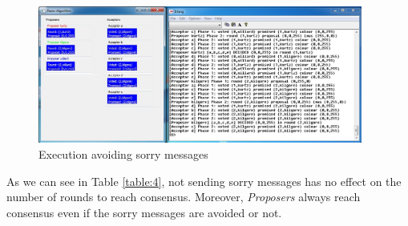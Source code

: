 \begin{figure}[h!]
  \centering
    \includegraphics[width=0.95\textwidth]{./3_Experiments/images/nosorry.jpg}
    \caption{Execution avoiding sorry messages \label{fig:nosorry}}
\end{figure}

As we can see in Table \ref{table:4}, not sending sorry messages has no effect
on the number of rounds to reach consensus. Moreover, \textit{Proposers} always
reach consensus even if the sorry messages are avoided or not. 

